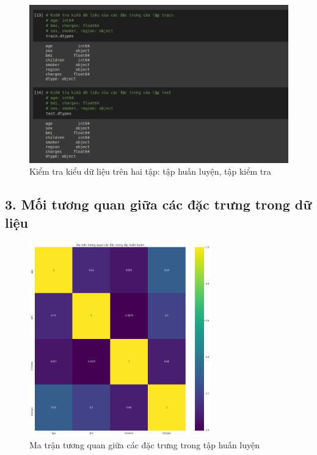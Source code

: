 \documentclass{article}
\begin{document}
	\begin{figure}[H]
		\centering
		\includegraphics[width=1\textwidth]{images/data_types_train_test.png}
		\caption{Kiểm tra kiểu dữ liệu trên hai tập: tập huấn luyện, tập kiểm tra}
		\label{fig:writing-thesis-data-type-train-test}
	\end{figure}

	
	\subsection{3. Mối tương quan giữa các đặc trưng trong dữ liệu}
	\begin{figure}[H]
		\centering
		\includegraphics[width=0.7\textwidth]{images/corr_matrix_train.png}
		\caption{Ma trận tương quan giữa các đặc trưng trong tập huấn luyện}
		\label{fig:writing-thesis-corr-matrix-train}
	\end{figure}
	
\end{document}
